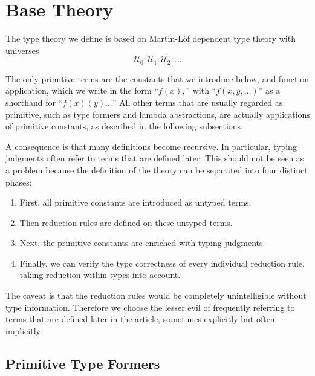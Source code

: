 \documentclass[a4paper]{article}
\theoremstyle{definition}
\theoremstyle{remark}
\newcommand{\univVar}{\mathcal}
\newcommand{\U}{\univVar{U}}
\newcommand{\0}{\primType{0}}
\newcommand{\1}{\primType{1}}
\newcommand{\2}{\primType{2}}
\begin{document}

\section{Base Theory}

The type theory we define is based on Martin-Löf dependent type theory with universes
\[\U_0 : \U_1 : \U_2 : \dots\]

The only primitive terms are the constants that we introduce below, and function application, which
we write in the form ``$f(x),$'' with ``$f(x,y,\dots)$'' as a shorthand for ``$f(x)(y)\dots$''
All other terms that are usually regarded as primitive, such as type formers and lambda
abstractions, are actually applications of primitive constants, as described in the following
subsections.

A consequence is that many definitions become recursive. In particular, typing judgments often
refer to terms that are defined later. This should not be seen as a problem because the definition
of the theory can be separated into four distinct phases:
\begin{enumerate}
  \item First, all primitive constants are introduced as untyped terms.
  \item Then reduction rules are defined on these untyped terms.
  \item Next, the primitive constants are enriched with typing judgments.
  \item Finally, we can verify the type correctness of every individual reduction rule, taking
  reduction within types into account.
\end{enumerate}
The caveat is that the reduction rules would be completely unintelligible without type information.
Therefore we choose the lesser evil of frequently referring to terms that are defined later in the
article, sometimes explicitly but often implicitly.

\subsection{Primitive Type Formers}
\end{document}
